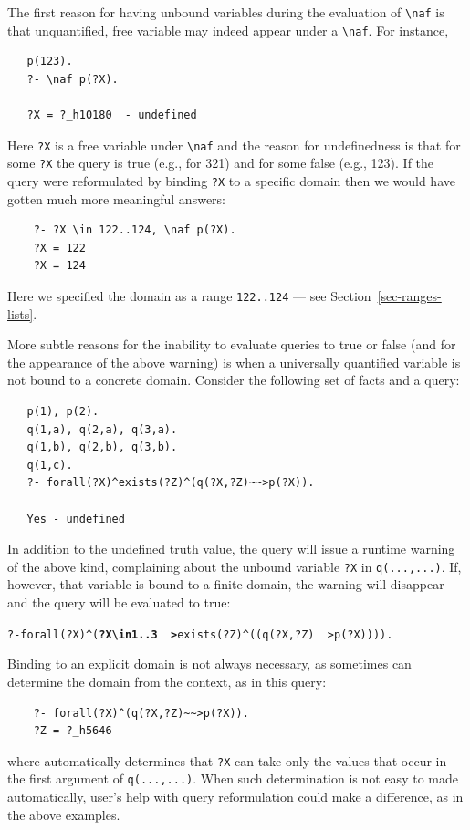 \documentclass[11pt]{article}
\newcommand{\ERGO}{\mbox{\smaller{\ensuremath{\cal{E}}\smaller{{\sc{RGO}}}}}\xspace}
\newcommand{\FLSYSTEM}{\ERGO}
\newcommand{\bs}{\textbackslash}
\newcommand{\RULELOGNAF}{{\texttt{{\bs}naf}}\xspace}
\begin{document}
The first reason for having unbound variables during the evaluation
of \RULELOGNAF is that unquantified, free variable may indeed appear under
a \RULELOGNAF.
For instance,
\begin{verbatim}
   p(123).
   ?- \naf p(?X).

   ?X = ?_h10180  - undefined
\end{verbatim}
Here \texttt{?X} is a free variable under \RULELOGNAF and 
the reason for undefinedness is that for some \texttt{?X} the query is true
(e.g., for 321) and for some false (e.g., 123).
If the query were reformulated by binding \texttt{?X} to a specific
domain then we would have gotten much more meaningful answers:
\begin{verbatim}
    ?- ?X \in 122..124, \naf p(?X).
    ?X = 122
    ?X = 124
\end{verbatim}
Here we specified the domain as a range \texttt{122..124} --- see
Section~\ref{sec-ranges-lists}. 

More subtle reasons for the inability to evaluate queries to true or false
(and for the appearance of the above warning) is when a universally
quantified variable
is not bound to a concrete domain. Consider the following set of facts and
a query:
\begin{verbatim}
   p(1), p(2).
   q(1,a), q(2,a), q(3,a).
   q(1,b), q(2,b), q(3,b).
   q(1,c).
   ?- forall(?X)^exists(?Z)^(q(?X,?Z)~~>p(?X)).

   Yes - undefined
\end{verbatim}
In addition to the undefined truth value, the query will issue a runtime
warning of the above kind, complaining about the unbound variable
\texttt{?X} in \texttt{q(...,...)}. If, however, that variable is bound to
a finite domain, the warning will disappear and the query will be evaluated
to true:
\begin{alltt}
    ?- forall(?X)^(\textnormal{\textbf{?X \bs{}in 1..3 ~~>}} exists(?Z)^((q(?X,?Z)~~>p(?X)))).
\end{alltt}
Binding to an explicit domain is not always necessary, as sometimes
\FLSYSTEM can determine the domain from the context, as in this query:
\begin{verbatim}
    ?- forall(?X)^(q(?X,?Z)~~>p(?X)).
    ?Z = ?_h5646
\end{verbatim}
where \FLSYSTEM automatically
determines that \texttt{?X} can take only the values that
occur in the first argument of \texttt{q(...,...)}.  
When such determination is not easy to made automatically, user's help
with query reformulation could make a difference, as in the above examples.
\end{document}
